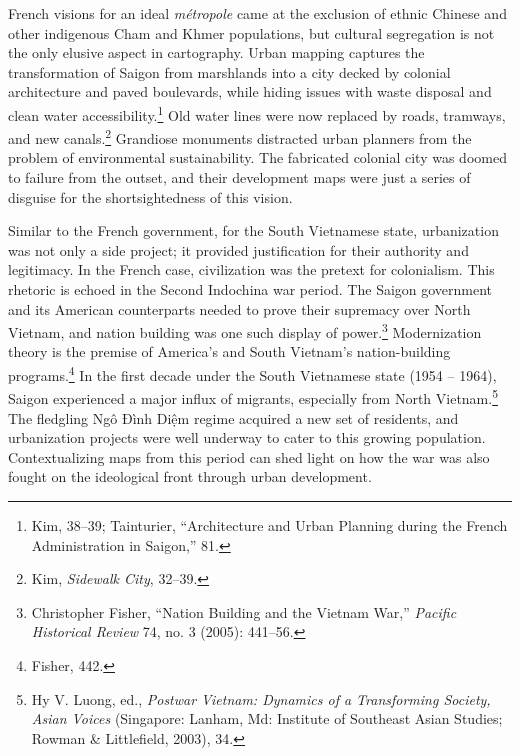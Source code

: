 French visions for an ideal \textit{métropole} came at the exclusion of ethnic Chinese and other indigenous Cham and Khmer populations, but cultural segregation is not the only elusive aspect in cartography. Urban mapping captures the transformation of Saigon from marshlands into a city decked by colonial architecture and paved boulevards, while hiding issues with waste disposal and clean water accessibility.\footnote{Kim, 38–39; Tainturier, “Architecture and Urban Planning during the French Administration in Saigon,” 81.} Old water lines were now replaced by roads, tramways, and new canals.\footnote{Kim, \textit{Sidewalk City}, 32–39.} Grandiose monuments distracted urban planners from the problem of environmental sustainability. The fabricated colonial city was doomed to failure from the outset, and their development maps were just a series of disguise for the shortsightedness of this vision.

Similar to the French government, for the South Vietnamese state, urbanization was not only a side project; it provided justification for their authority and legitimacy. In the French case, civilization was the pretext for colonialism. This rhetoric is echoed in the Second Indochina war period. The Saigon government and its American counterparts needed to prove their supremacy over North Vietnam, and nation building was one such display of power.\footnote{Christopher Fisher, “Nation Building and the Vietnam War,” \textit{Pacific Historical Review} 74, no. 3 (2005): 441–56.} Modernization theory is the premise of America’s and South Vietnam’s nation-building programs.\footnote{Fisher, 442.} In the first decade under the South Vietnamese state (1954 – 1964), Saigon experienced a major influx of migrants, especially from North Vietnam.\footnote{Hy V. Luong, ed., \textit{Postwar Vietnam: Dynamics of a Transforming Society, Asian Voices} (Singapore: Lanham, Md: Institute of Southeast Asian Studies; Rowman \& Littlefield, 2003), 34.} The fledgling Ngô Đình Diệm regime acquired a new set of residents, and urbanization projects were well underway to cater to this growing population. Contextualizing maps from this period can shed light on how the war was also fought on the ideological front through urban development.

